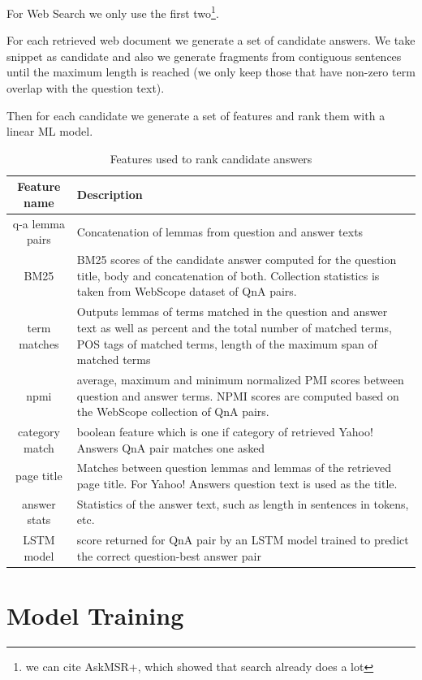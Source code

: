 \documentclass[]{article}
\begin{document}
For Web Search we only use the first two\footnote{we can cite AskMSR+, which showed that search already does a lot}.

For each retrieved web document we generate a set of candidate answers. We take snippet as candidate and also we generate fragments from contiguous sentences until the maximum length is reached (we only keep those that have non-zero term overlap with the question text).

Then for each candidate we generate a set of features and rank them with a linear ML model.

\begin{table}[t]
\label{table:features}
\caption{Features used to rank candidate answers}
\begin{tabular}{|c|p{10cm}|}
\hline
Feature name & Description \\
\hline
\hline
q-a lemma pairs & Concatenation of lemmas from question and answer texts\\
BM25 & BM25 scores of the candidate answer computed for the question title, body and concatenation of both. Collection statistics is taken from WebScope dataset of QnA pairs. \\
term matches & Outputs lemmas of terms matched in the question and answer text as well as percent and the total number of matched terms, POS tags of matched terms, length of the maximum span of matched terms\\
npmi & average, maximum and minimum normalized PMI scores between question and answer terms. NPMI scores are computed based on the WebScope collection of QnA pairs.\\
category match & boolean feature which is one if category of retrieved Yahoo! Answers QnA pair matches one asked\\
page title & Matches between question lemmas and lemmas of the retrieved page title. For Yahoo! Answers question text is used as the title.\\
answer stats & Statistics of the answer text, such as length in sentences in tokens, etc.\\
LSTM model & score returned for QnA pair by an LSTM model trained to predict the correct question-best answer pair\\
\hline
\end{tabular}
\end{table}

\section{Model Training}
\end{document}
